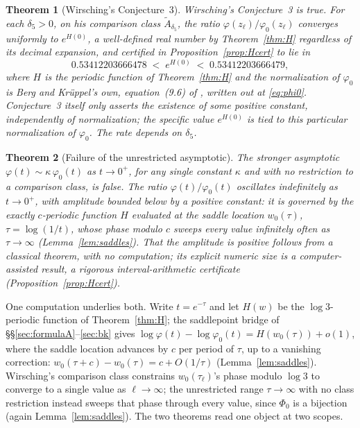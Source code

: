 \documentclass[11pt]{article}
\newtheorem{theorem}{Theorem}[section]
\theoremstyle{definition}
\theoremstyle{remark}
\begin{document}
\begin{theorem}[Wirsching's Conjecture~3]
\label{thm:conj3}
Wirsching's Conjecture~3 is true. For each $\delta_5>0$, on his comparison
class $\widetilde{A}_{\delta_5}$, the ratio
$\varphi(z_\ell)/\varphi_0(z_\ell)$ converges uniformly to $e^{H(0)}$, a well-defined real number by
Theorem~\ref{thm:H} regardless of its decimal expansion, and certified in
Proposition~\ref{prop:Hcert} to lie in
\[
 0.53412203666478 \;<\; e^{H(0)} \;<\; 0.53412203666479 ,
\]
where $H$ is the
periodic function of Theorem~\ref{thm:H} and the normalization of $\varphi_0$ is Berg and
Kr\"uppel's own, equation~(9.6) of \cite{BergKruppel1998}, written out at
\eqref{eq:phi0}. Conjecture~3 itself only asserts the
existence of some positive constant, independently of normalization; the specific value
$e^{H(0)}$ is tied to this particular normalization of $\varphi_0$. The rate depends on
$\delta_5$.
\end{theorem}

\begin{theorem}[Failure of the unrestricted asymptotic]
\label{thm:unrestricted}
The stronger asymptotic $\varphi(t) \sim \kappa\,\varphi_0(t)$ as $t \to 0^+$, for any single
constant $\kappa$ and with no restriction to a comparison class, is false. The ratio
$\varphi(t)/\varphi_0(t)$ oscillates indefinitely as $t \to 0^+$, with amplitude bounded below by a
positive constant: it is governed by the exactly $c$-periodic function $H$ evaluated at
the saddle location $w_0(\tau)$, $\tau=\log(1/t)$, whose phase modulo $c$ sweeps every value
infinitely often as $\tau\to\infty$ (Lemma~\ref{lem:saddles}). That the amplitude is positive
follows from a classical theorem, with no computation; its explicit numeric size is a
computer-assisted result, a rigorous interval-arithmetic certificate
(Proposition~\ref{prop:Hcert}).
\end{theorem}

One computation underlies both. Write $t = e^{-\tau}$ and let $H(w)$ be the
$\log 3$-periodic function of Theorem~\ref{thm:H}; the saddlepoint bridge of
\S\S\ref{sec:formulaA}--\ref{sec:bk} gives
$\log\varphi(t)-\log\varphi_0(t) = H(w_0(\tau))+o(1)$, where the saddle
location advances by $c$ per period of $\tau$, up to a vanishing correction:
$w_0(\tau+c)-w_0(\tau) = c+O(1/\tau)$ (Lemma~\ref{lem:saddles}). Wirsching's comparison class
constrains $w_0(\tau_\ell)$'s phase modulo $\log 3$ to converge to a single value as $\ell\to\infty$; the
unrestricted range $\tau\to\infty$ with no class restriction instead sweeps that phase through
every value, since $\Phi_0$ is a bijection (again Lemma~\ref{lem:saddles}). The two theorems
read one object at two scopes.
\end{document}
